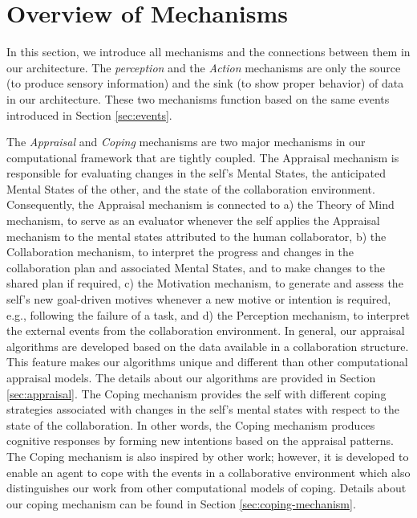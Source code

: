 \documentclass[12pt]{report}
\begin{document}
\section{Overview of Mechanisms}

{\color{red}In this section, we introduce all mechanisms and the connections
between them in our architecture. The \textit{perception} and the
\textit{Action} mechanisms are only the source (to produce sensory information)
and the sink (to show proper behavior) of data in our architecture. These two
mechanisms function based on the same events introduced in Section
\ref{sec:events}.}

{\color{red}The \textit{Appraisal} and \textit{Coping} mechanisms are two major
mechanisms in our computational framework that are tightly coupled. The
Appraisal mechanism is responsible for evaluating changes in the self's Mental
States, the anticipated Mental States of the other, and the state of the
collaboration environment. Consequently, the Appraisal mechanism is connected to
a) the Theory of Mind mechanism, to serve as an evaluator whenever the self
applies the Appraisal mechanism to the mental states attributed to the human
collaborator, b) the Collaboration mechanism, to interpret the progress and
changes in the collaboration plan and associated Mental States, and to make
changes to the shared plan if required, c) the Motivation mechanism, to generate
and assess the self's new goal-driven motives whenever a new motive or intention
is required, e.g., following the failure of a task, and d) the Perception
mechanism, to interpret the external events from the collaboration environment.
In general, our appraisal algorithms are developed based on the data available
in a collaboration structure. This feature makes our algorithms unique and
different than other computational appraisal models. The details about our
algorithms are provided in Section \ref{sec:appraisal}. The Coping mechanism
provides the self with different coping strategies associated with changes in
the self's mental states with respect to the state of the collaboration. In
other words, the Coping mechanism produces cognitive responses by forming new
intentions based on the appraisal patterns. The Coping mechanism is also
inspired by other work; however, it is developed to enable an agent to cope with
the events in a collaborative environment which also distinguishes our work from
other computational models of coping. Details about our coping mechanism can be
found in Section \ref{sec:coping-mechanism}.}
\end{document}
